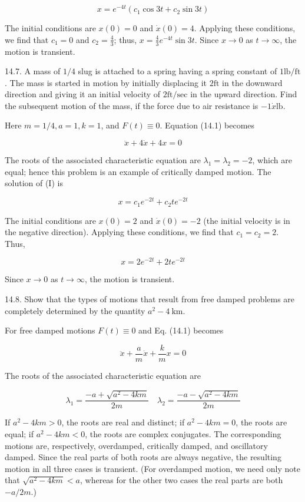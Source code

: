 \documentclass[10pt]{article}
\begin{document}
$$
x=e^{-4 t}\left(c_{1} \cos 3 t+c_{2} \sin 3 t\right)
$$

The initial conditions are $x(0)=0$ and $\dot{x}(0)=4$. Applying these conditions, we find that $c_{1}=0$ and $c_{2}=\frac{4}{3}$; thus, $x=\frac{4}{3} e^{-4 t} \sin 3 t$. Since $x \rightarrow 0$ as $t \rightarrow \infty$, the motion is transient.

14.7. A mass of $1 / 4$ slug is attached to a spring having a spring constant of $1 \mathrm{lb} / \mathrm{ft}$. The mass is started in motion by initially displacing it $2 \mathrm{ft}$ in the downward direction and giving it an initial velocity of $2 \mathrm{ft} / \mathrm{sec}$ in the upward direction. Find the subsequent motion of the mass, if the force due to air resistance is $-1 \dot{x} \mathrm{lb}$.

Here $m=1 / 4, a=1, k=1$, and $F(t) \equiv 0$. Equation (14.1) becomes


\begin{equation*}
\ddot{x}+4 \dot{x}+4 x=0 \tag{1}
\end{equation*}


The roots of the associated characteristic equation are $\lambda_{1}=\lambda_{2}=-2$, which are equal; hence this problem is an example of critically damped motion. The solution of (I) is

$$
x=c_{1} e^{-2 t}+c_{2} t e^{-2 t}
$$

The initial conditions are $x(0)=2$ and $\dot{x}(0)=-2$ (the initial velocity is in the negative direction). Applying these conditions, we find that $c_{1}=c_{2}=2$. Thus,

$$
x=2 e^{-2 t}+2 t e^{-2 t}
$$

Since $x \rightarrow 0$ as $t \rightarrow \infty$, the motion is transient.

14.8. Show that the types of motions that result from free damped problems are completely determined by the quantity $a^{2}-4 \mathrm{~km}$.

For free damped motions $F(t) \equiv 0$ and Eq. (14.1) becomes

$$
\ddot{x}+\frac{a}{m} \dot{x}+\frac{k}{m} x=0
$$

The roots of the associated characteristic equation are

$$
\lambda_{1}=\frac{-a+\sqrt{a^{2}-4 k m}}{2 m} \quad \lambda_{2}=\frac{-a-\sqrt{a^{2}-4 k m}}{2 m}
$$

If $a^{2}-4 k m>0$, the roots are real and distinct; if $a^{2}-4 k m=0$, the roots are equal; if $a^{2}-4 k m<0$, the roots are complex conjugates. The corresponding motions are, respectively, overdamped, critically damped, and oscillatory damped. Since the real parts of both roots are always negative, the resulting motion in all three cases is transient. (For overdamped motion, we need only note that $\sqrt{a^{2}-4 k m}<a$, whereas for the other two cases the real parts are both $-a / 2 m$.)
\end{document}
